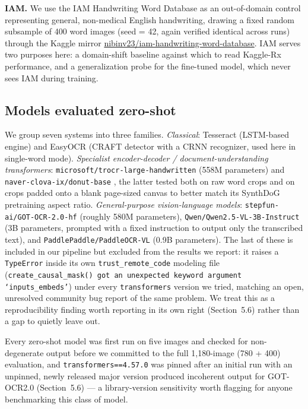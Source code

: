 \documentclass[12pt]{article}
\begin{document}
\textbf{IAM.} We use the IAM Handwriting Word Database \citep{Marti2002IAM} as an out-of-domain control
representing general, non-medical English handwriting, drawing a fixed random subsample of 400 word images
(seed = 42, again verified identical across runs) through the Kaggle mirror
\url{nibinv23/iam-handwriting-word-database}. IAM serves two purposes here: a domain-shift baseline
against which to read Kaggle-Rx performance, and a generalization probe for the fine-tuned model, which
never sees IAM during training.

\subsection{Models evaluated zero-shot}

{\small
We group seven systems into three families. \textit{Classical}: Tesseract \citep{Smith2007Tesseract}
(LSTM-based engine) and EasyOCR (CRAFT detector with a CRNN recognizer, used here in single-word mode).
\textit{Specialist encoder-decoder / document-understanding transformers}:
\texttt{microsoft/trocr-large-handwritten} \citep{Li2023TrOCR} (558M parameters) and
\texttt{naver-clova-ix/donut-base} \citep{Kim2022Donut}, the latter tested both on raw word crops and on
crops padded onto a blank page-sized canvas to better match its SynthDoG pretraining aspect ratio.
\textit{General-purpose vision-language models}: \texttt{stepfun-ai/GOT-OCR-2.0-hf} \citep{Wei2024GOTOCR}
(roughly 580M parameters), \texttt{Qwen/Qwen2.5-VL-3B-Instruct} \citep{Bai2025Qwen} (3B parameters, prompted
with a fixed instruction to output only the transcribed text), and
\texttt{PaddlePaddle/PaddleOCR-VL} \citep{Cui2025PaddleOCRVL} (0.9B parameters). The last of these is
included in our pipeline but excluded from the results we report: it raises a \texttt{TypeError} inside its
own \texttt{trust\_remote\_code} modeling file (\texttt{create\_causal\_mask() got an unexpected keyword
argument `inputs\_embeds'}) under every \texttt{transformers} version we tried, matching an open, unresolved
community bug report of the same problem. We treat this as a reproducibility finding worth reporting in its
own right (Section~5.6) rather than a gap to quietly leave out.
\par}

Every zero-shot model was first run on five images and checked for non-degenerate output before we
committed to the full 1{,}180-image (780 + 400) evaluation, and \texttt{transformers==4.57.0} was pinned
after an initial run with an unpinned, newly released major version produced incoherent output for
GOT-OCR2.0 (Section~5.6) --- a library-version sensitivity worth flagging for anyone benchmarking this class
of model.
\end{document}
